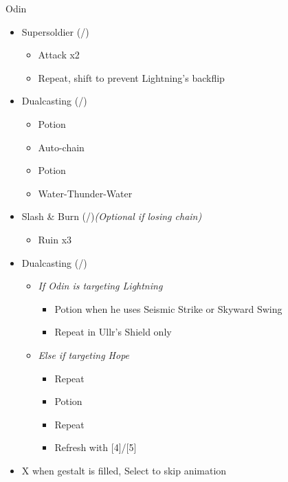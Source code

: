 \renewcommand{\first}{[1] Slash \& Burn (\com/\rav)}
\renewcommand{\second}{[2] Supersoldier (\com/\syn)}
\renewcommand{\fourth}{[4] Dualcasting (\rav/\rav)}
\renewcommand{\fifth}{[5] Dualcasting (\rav/\rav)}

\begin{battle}{Odin}
\begin{multicols}{2}
\begin{itemize}
    \item \second
    \begin{itemize}
        \item Attack x2
        \item Repeat, shift to prevent Lightning's backflip
    \end{itemize}
    \item \fourth
    \begin{itemize}
        \item Potion
        \item Auto-chain
        \item Potion
        \item Water-Thunder-Water
    \end{itemize}
	\item \first \textit{(Optional if losing chain)}
	\begin{itemize}
		\item Ruin x3
	\end{itemize}
    \columnbreak
    \item \fifth
    \begin{itemize}
        \item \textit{If Odin is targeting Lightning}
        \begin{itemize}
            \item Potion when he uses Seismic Strike or Skyward Swing
            \item Repeat in Ullr's Shield only
        \end{itemize}
        \item \textit{Else if targeting Hope}
        \begin{itemize}
            \item Repeat
            \item Potion
            \item Repeat
            \item Refresh with [4]/[5]
        \end{itemize}
    \end{itemize}
    \item X when gestalt is filled, Select to skip animation
\end{itemize}
\end{multicols}
\end{battle}

